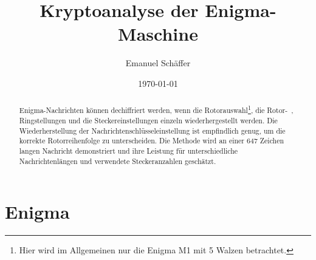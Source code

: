 \documentclass[ngerman, a4paper, footsepline, headsepline, numbers=noenddot]{scrreport}
\begin{document}
	\subject{Kryptoanalyse der Enigma-Maschine: Eine Untersuchung des Cyclometers und der Turing-Bombe}
	\title{Kryptoanalyse der Enigma-Maschine}
	\author{Emanuel Schäffer}
	\date{\today}
	\publishers{RWU--University of Applied Sciences}
	\maketitle
	
	\begin{abstract}
		Enigma-Nachrichten können dechiffriert werden, wenn die Rotorauswahl\footnote{Hier wird im Allgemeinen nur die Enigma M1 mit 5 Walzen betrachtet.}, die Rotor-~, Ringstellungen und die Steckereinstellungen einzeln wiederhergestellt werden. Die Wiederherstellung der Nachrichtenschlüsseleinstellung ist empfindlich genug, um die korrekte Rotorreihenfolge zu unterscheiden. Die Methode wird an einer 647 Zeichen langen Nachricht demonstriert und ihre Leistung für unterschiedliche Nachrichtenlängen und verwendete Steckeranzahlen geschätzt.
	\end{abstract}


	\chapter{Enigma}
	
\end{document}
